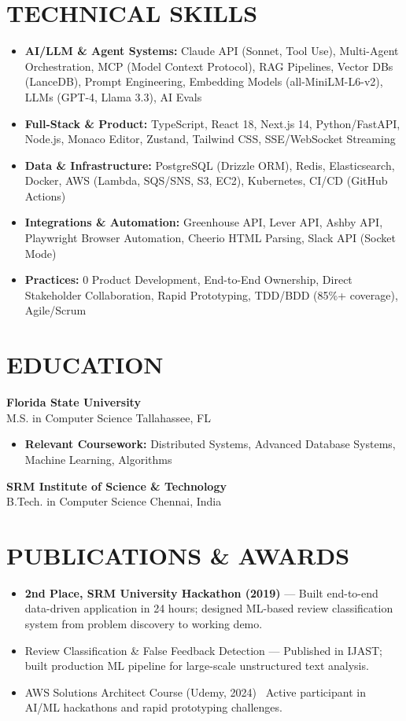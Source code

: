 \documentclass[letterpaper,10pt]{article}
\newcommand{\resumeItem}[1]{\item\small #1}
\newcommand{\resumeSubheading}[4]{
  \vspace{6pt}
  \noindent
  \textbf{#1} \hfill {\footnotesize #2} \\
  [-1pt]
  \noindent
  \small #3 \hfill {\small #4}
  \vspace{3pt}
}
\newcommand{\resumeItemsStart}{\vspace{-2pt}\begin{itemize}}
\newcommand{\resumeItemsEnd}{\end{itemize}\vspace{6pt}}
\begin{document}
\section{\textcolor{metablue}{TECHNICAL SKILLS}}
\vspace{-5pt}
\small
\begin{itemize}
\resumeItem{\textbf{AI/LLM \& Agent Systems:} Claude API (Sonnet, Tool Use), Multi-Agent Orchestration, MCP (Model Context Protocol), RAG Pipelines, Vector DBs (LanceDB), Prompt Engineering, Embedding Models (all-MiniLM-L6-v2), LLMs (GPT-4, Llama 3.3), AI Evals}
\resumeItem{\textbf{Full-Stack \& Product:} TypeScript, React 18, Next.js 14, Python/FastAPI, Node.js, Monaco Editor, Zustand, Tailwind CSS, SSE/WebSocket Streaming}
\resumeItem{\textbf{Data \& Infrastructure:} PostgreSQL (Drizzle ORM), Redis, Elasticsearch, Docker, AWS (Lambda, SQS/SNS, S3, EC2), Kubernetes, CI/CD (GitHub Actions)}
\resumeItem{\textbf{Integrations \& Automation:} Greenhouse API, Lever API, Ashby API, Playwright Browser Automation, Cheerio HTML Parsing, Slack API (Socket Mode)}
\resumeItem{\textbf{Practices:} 0 Product Development, End-to-End Ownership, Direct Stakeholder Collaboration, Rapid Prototyping, TDD/BDD (85\%+ coverage), Agile/Scrum}
\end{itemize}
\vspace{-10pt}


\section{\textcolor{metablue}{EDUCATION}}
\vspace{-10pt}
\resumeSubheading
{Florida State University}{}
{M.S. in Computer Science}{Tallahassee, FL}
\resumeItemsStart
\resumeItem{\textbf{Relevant Coursework:} Distributed Systems, Advanced Database Systems, Machine Learning, Algorithms}
\resumeItemsEnd
\vspace{-5pt}
\resumeSubheading
{SRM Institute of Science \& Technology}{}
{B.Tech. in Computer Science}{Chennai, India}
\vspace{-10pt}

\section{\textcolor{metablue}{PUBLICATIONS \& AWARDS}}
\vspace{-5pt}
\begin{itemize}
\resumeItem{\textbf{2nd Place, SRM University Hackathon (2019)} --- Built end-to-end data-driven application in 24 hours; designed ML-based review classification system from problem discovery to working demo.}
\resumeItem{Review Classification \& False Feedback Detection --- Published in IJAST; built production ML pipeline for large-scale unstructured text analysis.}
\resumeItem{AWS Solutions Architect Course (Udemy, 2024) \textbar\ Active participant in AI/ML hackathons and rapid prototyping challenges.}
\end{itemize}
\end{document}
